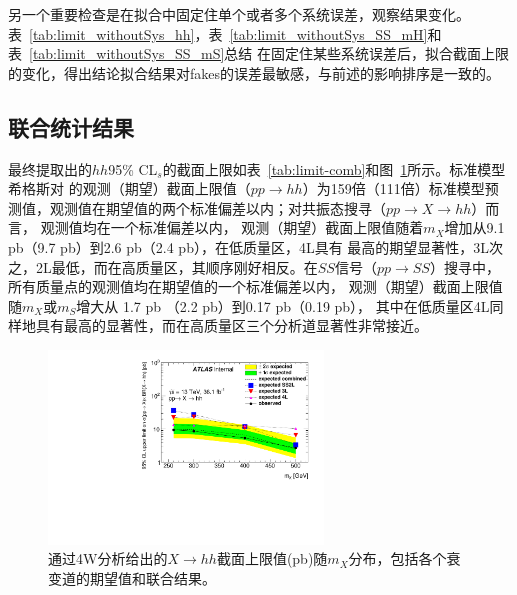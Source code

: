 另一个重要检查是在拟合中固定住单个或者多个系统误差，观察结果变化。表~\ref{tab:limit_withoutSys_hh}，表~\ref{tab:limit_withoutSys_SS_mH}和表~\ref{tab:limit_withoutSys_SS_mS}总结
在固定住某些系统误差后，拟合截面上限的变化，得出结论拟合结果对fakes的误差最敏感，与前述的影响排序是一致的。

\clearpage

\subsection{联合统计结果}
最终提取出的$hh$95\% CL$_s$的截面上限如表~\ref{tab:limit-comb}和图~\ref{fig:limit-comb}所示。标准模型希格斯对
的观测（期望）截面上限值（$pp\rightarrow hh$）为159倍（111倍）标准模型预测值，观测值在期望值的两个标准偏差以内；对共振态搜寻（$pp\rightarrow X\rightarrow hh$）而言，
观测值均在一个标准偏差以内，
观测（期望）截面上限值随着$m_X$增加从9.1 pb（9.7 pb）到2.6 pb（2.4 pb），在低质量区，4L具有
最高的期望显著性，3L次之，2L最低，而在高质量区，其顺序刚好相反。在$SS$信号（$pp\rightarrow SS$）搜寻中，所有质量点的观测值均在期望值的一个标准偏差以内，
观测（期望）截面上限值随$m_X$或$m_S$增大从
1.7 pb （2.2 pb）到0.17 pb（0.19 pb），
其中在低质量区4L同样地具有最高的显著性，而在高质量区三个分析道显著性非常接近。
\begin{figure}[!h!tpb]
  \centering
 \includegraphics[width=0.65\textwidth,angle=-90]{fig/Statistical/combination/limit-comb-hh-AllSys.pdf}
\caption{通过4W分析给出的$X\rightarrow hh$截面上限值(pb)随$m_X$分布，包括各个衰变道的期望值和联合结果。}
 \label{fig:limit-comb}
\end{figure}
